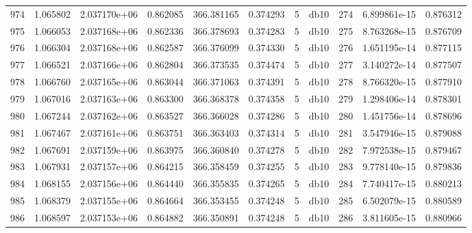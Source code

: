 \begin{tabular}{lrrrrrrlrrr}
974  &    1.065802 &        2.037170e+06 &  0.862085 &              366.381165 &    0.374293 &       5 &         db10 &    274 &   6.899861e-15 &      0.876312 \\
975  &    1.066053 &        2.037168e+06 &  0.862336 &              366.378693 &    0.374283 &       5 &         db10 &    275 &   8.763268e-15 &      0.876709 \\
976  &    1.066304 &        2.037168e+06 &  0.862587 &              366.376099 &    0.374330 &       5 &         db10 &    276 &   1.651195e-14 &      0.877115 \\
977  &    1.066521 &        2.037166e+06 &  0.862804 &              366.373535 &    0.374474 &       5 &         db10 &    277 &   3.140272e-14 &      0.877507 \\
978  &    1.066760 &        2.037165e+06 &  0.863044 &              366.371063 &    0.374391 &       5 &         db10 &    278 &   8.766320e-15 &      0.877910 \\
979  &    1.067016 &        2.037163e+06 &  0.863300 &              366.368378 &    0.374358 &       5 &         db10 &    279 &   1.298406e-14 &      0.878301 \\
980  &    1.067244 &        2.037162e+06 &  0.863527 &              366.366028 &    0.374286 &       5 &         db10 &    280 &   1.451756e-14 &      0.878696 \\
981  &    1.067467 &        2.037161e+06 &  0.863751 &              366.363403 &    0.374314 &       5 &         db10 &    281 &   3.547946e-15 &      0.879088 \\
982  &    1.067691 &        2.037159e+06 &  0.863975 &              366.360840 &    0.374278 &       5 &         db10 &    282 &   7.972538e-15 &      0.879467 \\
983  &    1.067931 &        2.037157e+06 &  0.864215 &              366.358459 &    0.374255 &       5 &         db10 &    283 &   9.778140e-15 &      0.879836 \\
984  &    1.068155 &        2.037156e+06 &  0.864440 &              366.355835 &    0.374265 &       5 &         db10 &    284 &   7.740417e-15 &      0.880213 \\
985  &    1.068379 &        2.037155e+06 &  0.864664 &              366.353455 &    0.374248 &       5 &         db10 &    285 &   6.502079e-15 &      0.880589 \\
986  &    1.068597 &        2.037153e+06 &  0.864882 &              366.350891 &    0.374248 &       5 &         db10 &    286 &   3.811605e-15 &      0.880966 \\

\end{tabular}
